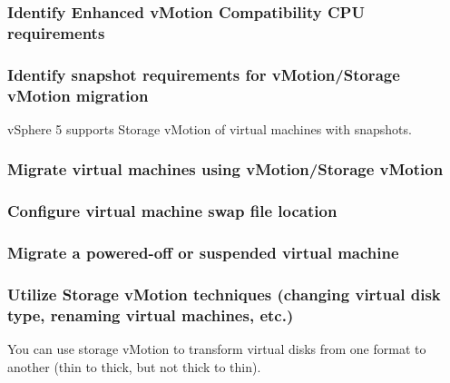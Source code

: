 \subsubsection{Identify Enhanced vMotion Compatibility CPU requirements}

\subsubsection{Identify snapshot requirements for vMotion/Storage vMotion migration}

vSphere 5 supports Storage vMotion of virtual machines with snapshots.

\subsubsection{Migrate virtual machines using vMotion/Storage vMotion}

\subsubsection{Configure virtual machine swap file location}

\subsubsection{Migrate a powered-off or suspended virtual machine}

\subsubsection{Utilize Storage vMotion techniques (changing virtual disk type, renaming virtual machines, etc.)}

You can use storage vMotion to transform virtual disks from one format to
another (thin to thick, but not thick to thin).
